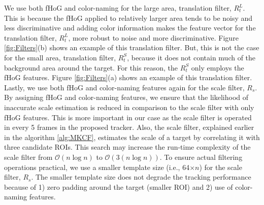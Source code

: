 \documentclass[10pt,twocolumn,letterpaper]{article}
\begin{document}
We use both fHoG \cite{felzenszwalb2010object} and color-naming
\cite{van2009learning} for the large area, translation filter,
$R_{t}^{L}$. This is because the fHoG applied to relatively larger
area tends to be noisy and less discriminative and adding color
information makes the feature vector for the translation filter,
$R_{t}^{L}$, more robust to noise and more discriminative. Figure
\ref{fig:Filters}(b) shows an example of this translation filter. But,
this is not the case for the small area, translation filter,
$R_{t}^{S}$, because it does not contain much of the background area
around the target. For this reason, the $R_{t}^{S}$ only employs the
fHoG features. Figure \ref{fig:Filters}(a) shows an example of this
translation filter. Lastly, we use both fHoG and color-naming features
again for the scale filter, $R_{s}$. By assigning fHoG and
color-naming features, we ensure that the likelihood of inaccurate
scale estimation is reduced in comparison to the scale filter with
only fHoG features. This is more important in our case as the scale
filter is operated in every 5 frames in the proposed tracker. Also,
the scale filter, explained earlier in the algorithm \ref{alg:MKCF},
estimates the scale of a target by correlating it with three candidate
ROIs. This search may increase the run-time complexity of the scale
filter from $\mathcal{O}(n\log n)$ to $\mathcal{O}(3(n\log n))$. To
ensure actual filtering operations practical, we use a smaller
template size (i.e., 64$\times n$) for the scale filter, $R_{s}$. The
smaller template size does not degrade the tracking performance
because of 1) zero padding around the target (smaller ROI) and 2) use
of color-naming features.
\end{document}
